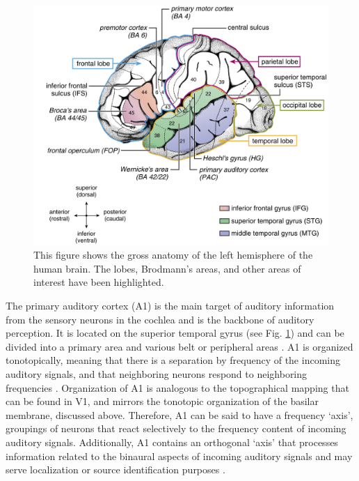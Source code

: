 \documentclass[titlepage]{article}
\begin{document}
    \begin{figure}
      \centering
      \includegraphics[scale=0.23]{primaryAuditoryAnatomy}
      \caption{This figure shows the gross anatomy of the left hemisphere
      of the human brain. The lobes, Brodmann's areas, and other areas
      of interest have been highlighted. \cite{Friederici2011}}
      \label{primaryAuditoryAnatomy}
    \end{figure}

    The primary auditory cortex (A1) is the main target of auditory information
    from the sensory neurons in the cochlea and is the backbone of auditory
    perception. It is located on the superior temporal gyrus
    (see Fig. \ref{primaryAuditoryAnatomy}) and can be divided into a primary
    area and various belt or peripheral areas \cite{Purves2001}. A1 is organized
    tonotopically, meaning that there is a separation by frequency of the
    incoming auditory signals, and that neighboring neurons respond to
    neighboring frequencies \cite{Lauter1985}. Organization of A1 is analogous
    to the topographical mapping that can be found in V1, and mirrors the
    tonotopic organization of the basilar membrane, discussed above.
    Therefore, A1 can be said to
    have a frequency `axis', groupings of neurons that react selectively to the
    frequency content of incoming auditory signals. Additionally, A1 contains an
    orthogonal `axis' that processes information related to the binaural aspects
    of incoming auditory signals and may serve localization or source
    identification purposes \cite{Purves2001}.
\end{document}
